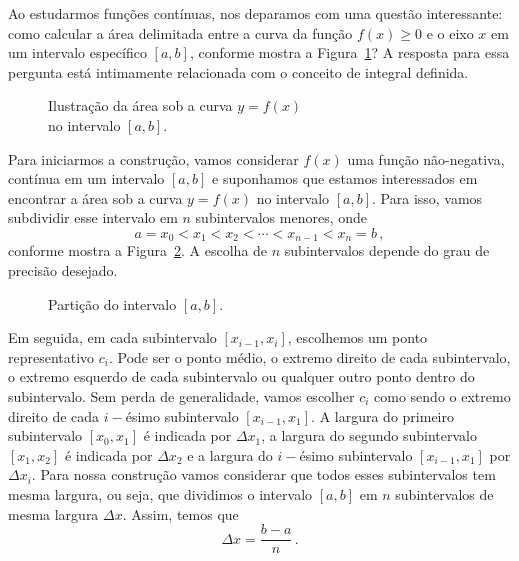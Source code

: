 Ao estudarmos funções contínuas, nos deparamos com uma questão interessante:
como calcular a área delimitada entre a curva da função $f(x) \geq 0$
e o eixo $x$ em um intervalo específico $[a, b]$, conforme mostra a
Figura~\ref{fig:areasobumacurva}? A resposta para essa pergunta está
intimamente relacionada com o conceito de integral definida.

\begin{figure}[h!]
   \centering
   
   \caption{Ilustração da área sob a curva $y=f(x)$\\no intervalo $[a, b]$.}
   \label{fig:areasobumacurva}
\end{figure}

Para iniciarmos a construção, vamos considerar $f(x)$ uma função não-negativa,
contínua em um intervalo $[a, b]$ e suponhamos
que estamos interessados em encontrar a área sob a curva $y=f(x)$
no intervalo $[a, b]$. Para isso, vamos subdividir esse intervalo em
$n$ subintervalos menores, onde
\[
  a = x_0 < x_1 < x_2 < \cdots < x_{n-1} < x_n = b \,,
\]
conforme mostra a
Figura~\ref{fig:particao}.
A escolha de $n$ subintervalos depende do grau de precisão desejado.

\begin{figure}
   \centering
   
   \caption{Partição do intervalo $[a, b]$.}
   \label{fig:particao}
\end{figure}

Em seguida, em cada subintervalo $[x_{i-1}, x_i]$, escolhemos um ponto
representativo $c_i$. Pode ser o ponto médio, o extremo direito de cada
subintervalo, o extremo esquerdo de cada subintervalo ou qualquer outro
ponto dentro do subintervalo. Sem perda de generalidade, vamos escolher
$c_i$ como sendo o extremo direito de cada $i-$ésimo subintervalo
$[x_{i-1}, x_1]$. A largura do primeiro subintervalo $[x_0, x_1]$ é
indicada por $\Delta x_1$, a largura do segundo subintervalo $[x_1, x_2]$
é indicada por $\Delta x_2 $ e a largura do $i-$ésimo subintervalo
$[x_{i-1}, x_1]$ por $\Delta x_i$. Para nossa construção vamos considerar
que todos esses subintervalos tem mesma largura, ou seja, que dividimos
o intervalo $[a, b]$ em $n$ subintervalos de mesma largura $\Delta x$.
Assim, temos que
\[
  \Delta x= \frac{b-a}{n} \,.
\]

